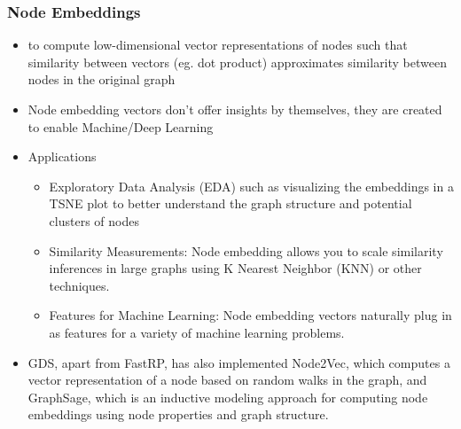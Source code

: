 \begin{frame}[fragile]\frametitle{Node Embeddings}

\begin{itemize}
\item to compute low-dimensional vector representations of nodes such that similarity between vectors (eg. dot product) approximates similarity between nodes in the original graph
\item Node embedding vectors don’t offer insights by themselves, they are created to enable Machine/Deep Learning
\item Applications
	\begin{itemize}
	\item Exploratory Data Analysis (EDA) such as visualizing the embeddings in a TSNE plot to better understand the graph structure and potential clusters of nodes
	\item Similarity Measurements: Node embedding allows you to scale similarity inferences in large graphs using K Nearest Neighbor (KNN) or other techniques.
	\item Features for Machine Learning: Node embedding vectors naturally plug in as features for a variety of machine learning problems. 
	\end{itemize}
\item GDS, apart from FastRP, has also implemented Node2Vec, which computes a vector representation of a node based on random walks in the graph, and GraphSage, which is an inductive modeling approach for computing node embeddings using node properties and graph structure.	
\end{itemize}

\end{frame}


